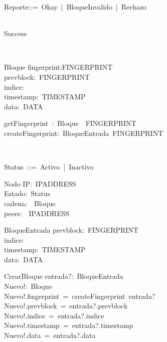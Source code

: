 \begin{zed}
Reporte::=~Okay~|~BloqueInvalido~|~Rechazo~\\
\\
\end{zed}
\begin{zed}
Success\\
\end{zed}
\begin{zed}
\\
\end{zed}
\begin{schema}{Bloque}
fingerprint:FINGERPRINT\\
prevblock:~FINGERPRINT\\
indice:~\nat\\
timestamp:~TIMESTAMP\\
data:~DATA\\
\end{schema}
\begin{axdef}
getFingerprint~:~Bloque~\fun~FINGERPRINT\\
createFingerprint:~BloqueEntrada\fun~FINGERPRINT\\
\end{axdef}
\begin{zed}
[IPADDRESS]\\
\end{zed}
\begin{zed}
Status~::=~Activo~|~Inactivo\\
\end{zed}
\begin{schema}{Nodo}
IP:~IPADDRESS\\
Estado:~Status\\
cadena:~\seq~Bloque\\
peers:~\power~IPADDRESS\\
\end{schema}
\begin{schema}{BloqueEntrada}
prevblock:~FINGERPRINT~\\
indice:~\nat\\
timestamp:~TIMESTAMP\\
data:~DATA\\
\end{schema}
\begin{schema}{CrearBloque}
entrada?:~BloqueEntrada\\
Nuevo!:~Bloque\\
\where
Nuevo!.fingerprint~=~createFingerprint~entrada?\\
Nuevo!.prevblock~=~entrada?.prevblock\\
Nuevo!.indice~=~entrada?.indice\\
Nuevo!.timestamp~=~entrada?.timestamp\\
Nuevo!.data~=~entrada?.data\\
\end{schema}
